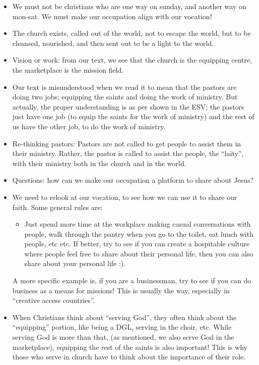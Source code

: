 \begin{itemize}
{\begin{itemize}
{  of God), on Mon-Sat, it is about ``being'' (Sharing Christ,
  Chirst-likeness).}
  \end{itemize}}
  \item{We must not be christians who are one way on sunday, and another way on mon-sat. We must make our occupation align with our vocation!}
  \item{The church exists, called out of the world, not to escape the world, but to be cleansed, nourished, and then sent out to be a light to the world.}
  \item{Vision or work: from our text, we see that the church is the equipping centre, the marketplace is the mission field. }
  \item{Our text is misunderstood when we read it to mean that the pastors
  are doing two jobs; equipping the saints and doing the work of ministry.
  But actually, the proper understanding is as per shown in the ESV; the
  pastors just have one job (to equip the saints for the work of ministry)
  and the rest of us have the other job, to do the work of ministry.}
  \item{Re-thinking pastors: Pastors are not called to get people to assist them in their ministry. Rather, the pastor is called to assist the people, the ``laity'', with their ministry both in the church and in the world.}
  \item{Questions: how can we make our occupation a platform to share about Jesus?}
  \item{We need to relook at our vocation, to see how we can use it to share
  our faith. Some general rules are:
  \begin{itemize}
    \item{Just spend more time at the workplace making casual conversations
    with people, walk through the pantry when you go to the toilet, eat lunch
    with people, etc etc. If better, try to see if you can create a
    hospitable culture where people feel free to share about their personal
    life, then you can also share about your personal life :).}
  \end{itemize}
  A more specific example is, if you are a businessman, try to see if you can
  do business as a means for missions! This is usually the way, especially in
  “creative access countries”. }
  \item{When Christians think about “serving God”, they often think about the “equipping” portion, like being a DGL, serving in the choir, etc. While serving God is more than that, (as mentioned, we also serve God in the marketplace), equipping the rest of the saints is also important! This is why those who serve in church have to think about the importance of their role.}

\end{itemize}
